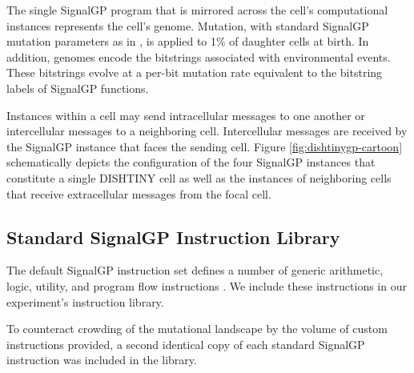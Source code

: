 The single SignalGP program that is mirrored across the cell's computational instances represents the cell's genome.
Mutation, with standard SignalGP mutation parameters as in \cite{lalejini2018evolving}, is applied to 1\% of daughter cells at birth.
In addition, genomes encode the bitstrings associated with environmental events.
These bitstrings evolve at a per-bit mutation rate equivalent to the bitstring labels of SignalGP functions.

Instances within a cell may send intracellular messages to one another or intercellular messages to a neighboring cell.
Intercellular messages are received by the SignalGP instance that faces the sending cell.
Figure \ref{fig:dishtinygp-cartoon} schematically depicts the configuration of the four SignalGP instances that constitute a single DISHTINY cell as well as the instances of neighboring cells that receive extracellular messages from the focal cell.

\subsection{Standard SignalGP Instruction Library} \label{sup:standard_instruction_library}

The default SignalGP instruction set defines a number of generic arithmetic, logic, utility, and program flow instructions \cite{lalejini2018evolving}.
We include these instructions in our experiment's instruction library.

To counteract crowding of the mutational landscape by the volume of custom instructions provided, a second identical copy of each standard SignalGP instruction was included in the library.

